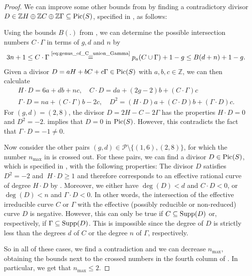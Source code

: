 \documentclass[english,11pt,reqno]{amsart}
\newcommand{\sub}{\subseteq}
\newcommand{\Pfour}{\mathbb{P}^4}
\newcommand{\Z}{\mathbb{Z}}
\newcommand{\Pic}{\textup{Pic}}
\newcommand{\supp}{\textup{Supp}}
\begin{document}
\begin{proof}
We can improve some other bounds from  by finding a contradictory divisor $D\in \Z H \oplus \Z C \oplus \Z \Gamma \sub \Pic(S)$, specified in , as follows: \par 
Using the bounds $B(.)$ from , we can determine the possible intersection numbers $C\cdot \Gamma$ in terms of $g,d$ and $n$ by
$$ 3n+1 \leq C\cdot \Gamma \overset{\textup{\eqref{eq:genus_of_C_union_Gamma}}}{=} p_a(C\cup\Gamma)+1-g \leq B(d+n)+1-g.$$
Given a divisor $D=aH+bC+c\Gamma\in \Pic(S)$ with $a,b,c\in\Z$, we can then calculate 
\begin{gather*}
H\cdot D = 6a+db+nc,\quad C\cdot D =da+ (2g-2)b+ (C\cdot \Gamma)c\\
\Gamma \cdot D = na + (C\cdot \Gamma)b-2c, \quad D^2 = (H\cdot D)a + (C\cdot D)b+ (\Gamma \cdot D)c.
\end{gather*}
For $(g,d)=(2,8)$, the divisor $D=2H-C-2\Gamma$ has the properties $H\cdot D=0$ and $D^2=-2$.  implies that $D=0$ in $\Pic(S)$. However, this contradicts the fact that $\Gamma \cdot D=-1 \neq 0$. \par 
Now consider the other pairs $(g,d)\in\mathcal{P}\setminus \{(1,6), (2,8)\}$, for which the number $n_{\max}$ in  is crossed out. For these pairs, we can find a divisor $D\in\Pic(S)$, which is specified in , with the following properties: The divisor $D$ satisfies $D^2=-2$ and $\:H\cdot D \geq 1$ and therefore corresponds to an effective rational curve of degree $H\cdot D$ by . Moreover, we either have $\deg(D)<d$ and $C\cdot D <0$, or $\deg(D)<n$ and $\Gamma \cdot D<0$. In other words, the intersection of the effective irreducible curve $C$ or $\Gamma$ with the effective (possibly reducible or non-reduced) curve $D$ is negative. However, this can only be true if $C\sub \supp(D)$ or, respectively, if $\Gamma \sub \supp(D)$. This is impossible since the degree of $D$ is strictly less than the degrees $d$ of $C$ or the degree $n$ of $\Gamma$, respectively. \par 
So in all of these cases, we find a contradiction and we can decrease $n_{\max}$, obtaining the bounds next to the crossed numbers in the fourth column of . In particular, we get that $n_{\max} \leq 2$. 
%
\begin{table}[H]
\caption{If we suppose that a smooth irreducible curve $C\sub Y$ of degree $d$ and genus $g$ is contained in a smooth hypercubic section $S$ of a smooth hyperquadric $Y\sub \Pfour$ and that $C$ admits an irreducible curve $\Gamma\sub Y$ of degree $n$ that is at least $3n+1$-secant to $C$, then we can find a contradictory effective divisor $D\in \Pic(S)$ that has a negative intersection with either $C$ or with $\Gamma$.}

\end{table}
\end{proof}
\end{document}
